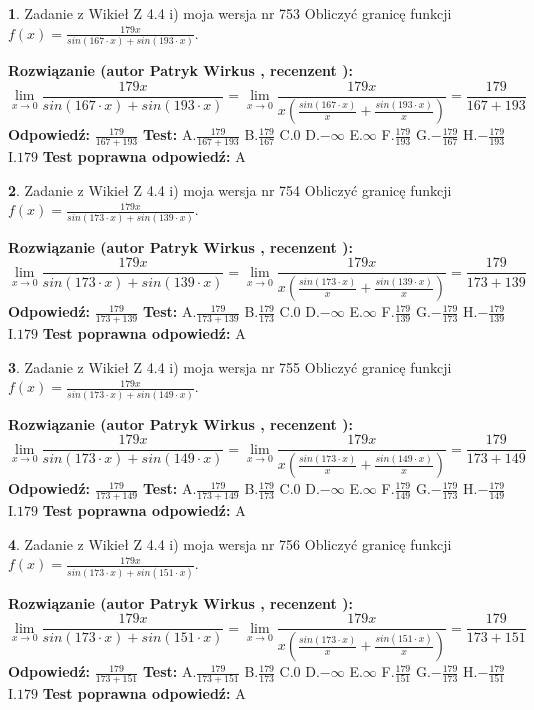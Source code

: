 \documentclass[12pt, a4paper]{article}
\theoremstyle{definition} %
\newtheorem{zad}{}
\newcommand{\zadStart}[1]{\begin{zad}#1\newline}
\newcommand{\zadStop}{\end{zad}}
\newcommand{\rozwStart}[2]{\noindent \textbf{Rozwiązanie (autor #1 , recenzent #2): }\newline}
\newcommand{\rozwStop}{\newline}
\newcommand{\odpStart}{\noindent \textbf{Odpowiedź:}\newline}
\newcommand{\odpStop}{\newline}
\newcommand{\testStart}{\noindent \textbf{Test:}\newline}
\newcommand{\testStop}{\newline}
\newcommand{\kluczStart}{\noindent \textbf{Test poprawna odpowiedź:}\newline}
\newcommand{\kluczStop}{\newline}
\begin{document}
\zadStart{Zadanie z Wikieł Z 4.4 i) moja wersja nr 753}
Obliczyć granicę funkcji $f(x)=\frac{179x}{sin(167\cdot x) +sin(193\cdot x)}$.
\zadStop
\rozwStart{Patryk Wirkus}{}
$$\lim\limits_{x\to 0}\frac{179x}{sin(167\cdot x) +sin(193\cdot x)}=\lim\limits_{x\to 0}\frac{179x}{x(\frac{sin(167\cdot x)}{x}+\frac{sin(193\cdot x)}{x})}=\frac{179}{167+193}$$
\rozwStop
\odpStart
$\frac{179}{167+193}$
\odpStop
\testStart
A.$\frac{179}{167+193}$
B.$\frac{179}{167}$
C.$0$
D.$-\infty$
E.$\infty$
F.$\frac{179}{193}$
G.$-\frac{179}{167}$
H.$-\frac{179}{193}$
I.$179$
\testStop
\kluczStart
A
\kluczStop



\zadStart{Zadanie z Wikieł Z 4.4 i) moja wersja nr 754}
Obliczyć granicę funkcji $f(x)=\frac{179x}{sin(173\cdot x) +sin(139\cdot x)}$.
\zadStop
\rozwStart{Patryk Wirkus}{}
$$\lim\limits_{x\to 0}\frac{179x}{sin(173\cdot x) +sin(139\cdot x)}=\lim\limits_{x\to 0}\frac{179x}{x(\frac{sin(173\cdot x)}{x}+\frac{sin(139\cdot x)}{x})}=\frac{179}{173+139}$$
\rozwStop
\odpStart
$\frac{179}{173+139}$
\odpStop
\testStart
A.$\frac{179}{173+139}$
B.$\frac{179}{173}$
C.$0$
D.$-\infty$
E.$\infty$
F.$\frac{179}{139}$
G.$-\frac{179}{173}$
H.$-\frac{179}{139}$
I.$179$
\testStop
\kluczStart
A
\kluczStop



\zadStart{Zadanie z Wikieł Z 4.4 i) moja wersja nr 755}
Obliczyć granicę funkcji $f(x)=\frac{179x}{sin(173\cdot x) +sin(149\cdot x)}$.
\zadStop
\rozwStart{Patryk Wirkus}{}
$$\lim\limits_{x\to 0}\frac{179x}{sin(173\cdot x) +sin(149\cdot x)}=\lim\limits_{x\to 0}\frac{179x}{x(\frac{sin(173\cdot x)}{x}+\frac{sin(149\cdot x)}{x})}=\frac{179}{173+149}$$
\rozwStop
\odpStart
$\frac{179}{173+149}$
\odpStop
\testStart
A.$\frac{179}{173+149}$
B.$\frac{179}{173}$
C.$0$
D.$-\infty$
E.$\infty$
F.$\frac{179}{149}$
G.$-\frac{179}{173}$
H.$-\frac{179}{149}$
I.$179$
\testStop
\kluczStart
A
\kluczStop



\zadStart{Zadanie z Wikieł Z 4.4 i) moja wersja nr 756}
Obliczyć granicę funkcji $f(x)=\frac{179x}{sin(173\cdot x) +sin(151\cdot x)}$.
\zadStop
\rozwStart{Patryk Wirkus}{}
$$\lim\limits_{x\to 0}\frac{179x}{sin(173\cdot x) +sin(151\cdot x)}=\lim\limits_{x\to 0}\frac{179x}{x(\frac{sin(173\cdot x)}{x}+\frac{sin(151\cdot x)}{x})}=\frac{179}{173+151}$$
\rozwStop
\odpStart
$\frac{179}{173+151}$
\odpStop
\testStart
A.$\frac{179}{173+151}$
B.$\frac{179}{173}$
C.$0$
D.$-\infty$
E.$\infty$
F.$\frac{179}{151}$
G.$-\frac{179}{173}$
H.$-\frac{179}{151}$
I.$179$
\testStop
\kluczStart
A
\kluczStop
\end{document}
